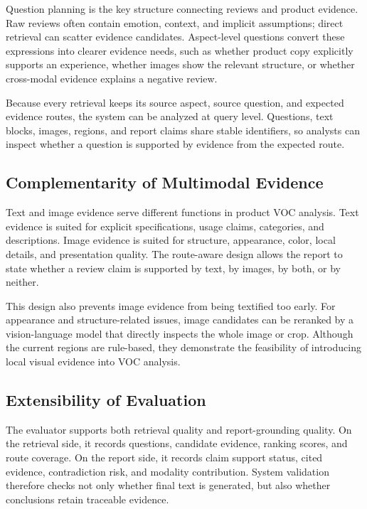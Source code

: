 \documentclass[11pt]{article}
\begin{document}
Question planning is the key structure connecting reviews and product evidence. Raw reviews often contain emotion, context, and implicit assumptions; direct retrieval can scatter evidence candidates. Aspect-level questions convert these expressions into clearer evidence needs, such as whether product copy explicitly supports an experience, whether images show the relevant structure, or whether cross-modal evidence explains a negative review.

Because every retrieval keeps its source aspect, source question, and expected evidence routes, the system can be analyzed at query level. Questions, text blocks, images, regions, and report claims share stable identifiers, so analysts can inspect whether a question is supported by evidence from the expected route.

\subsection{Complementarity of Multimodal Evidence}

Text and image evidence serve different functions in product VOC analysis. Text evidence is suited for explicit specifications, usage claims, categories, and descriptions. Image evidence is suited for structure, appearance, color, local details, and presentation quality. The route-aware design allows the report to state whether a review claim is supported by text, by images, by both, or by neither.

This design also prevents image evidence from being textified too early. For appearance and structure-related issues, image candidates can be reranked by a vision-language model that directly inspects the whole image or crop. Although the current regions are rule-based, they demonstrate the feasibility of introducing local visual evidence into VOC analysis.

\subsection{Extensibility of Evaluation}

The evaluator supports both retrieval quality and report-grounding quality. On the retrieval side, it records questions, candidate evidence, ranking scores, and route coverage. On the report side, it records claim support status, cited evidence, contradiction risk, and modality contribution. System validation therefore checks not only whether final text is generated, but also whether conclusions retain traceable evidence.
\end{document}
